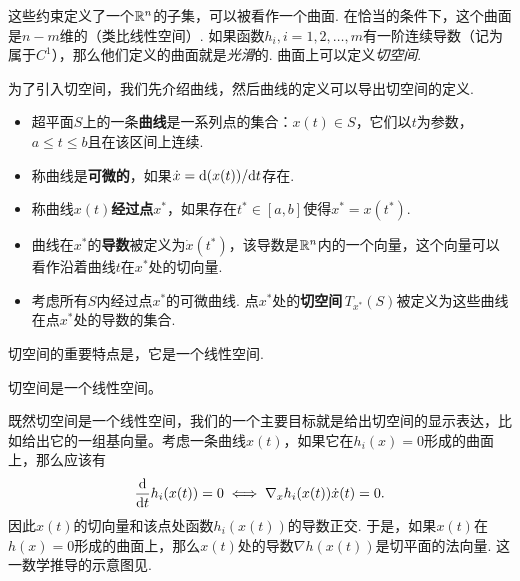 这些约束定义了一个$\mathbb{R}^n$的子集，可以被看作一个曲面. 在恰当的条件下，这个曲面是$n-m$维的（类比线性空间）. 如果函数$h_i,i=1,2,\dots,m$有一阶连续导数（记为属于$C^1$），那么他们定义的曲面就是\emph{光滑}的. 曲面上可以定义\emph{切空间}.
    
为了引入切空间，我们先介绍曲线，然后曲线的定义可以导出切空间的定义. 
\begin{definition}[曲线与切空间]
\begin{itemize}
    \item 超平面$S$上的一条\textbf{曲线}是一系列点的集合：${x}(t)\in S$，它们以$t$为参数，$a\le t\le b$且在该区间上连续. 
    \item 称曲线是\textbf{可微的}，如果$\dot{{x}}=\mathrm{d}({x}(t))/\mathrm{d} t$存在. 
    \item 称曲线${x}(t)$\textbf{经过点${x^\ast}$}，如果存在$t^\ast\in[a,b]$使得${x^\ast}={x}(t^\ast)$. 
    \item 曲线在${x^\ast}$的\textbf{导数}被定义为$\dot{{x}}(t^\ast)$，该导数是$\mathbb{R}^n$内的一个向量，这个向量可以看作沿着曲线$t$在$x^\ast$处的切向量.
    \item 考虑所有$S$内经过点${x^\ast}$的可微曲线. 点${x^\ast}$处的\textbf{切空间}\,$T_{x^\ast}(S)$被定义为这些曲线在点${x^\ast}$处的导数的集合. 
\end{itemize}
\end{definition}

切空间的重要特点是，它是一个线性空间.
\begin{lemma}\label{lemma:tan-space}
    切空间是一个线性空间。
\end{lemma}

既然切空间是一个线性空间，我们的一个主要目标就是给出切空间的显示表达，比如给出它的一组基向量。考虑一条曲线$x(t)$，如果它在$h_i(x)=0$形成的曲面上，那么应该有
    \[\frac{\mathrm{d}}{\mathrm{d} t}h_i(x(t))=0\iff \nabla_x h_i(x(t))\dot{x}(t)=0.\]
因此${x}(t)$的切向量和该点处函数$h_i({x}(t))$的导数正交. 于是，如果$x(t)$在$h(x)=0$形成的曲面上，那么${x}(t)$处的导数$\nabla h(x(t))$是切平面的法向量. 这一数学推导的示意图见.

